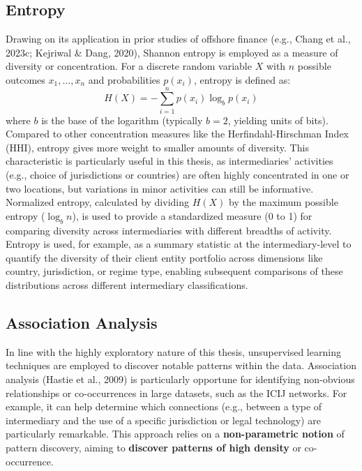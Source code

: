 \subsection{Entropy}
\label{subsec:entropy}
Drawing on its application in prior studies of offshore finance (e.g., Chang et al., 2023c; Kejriwal \& Dang, 2020), Shannon entropy is employed as a measure of diversity or concentration. For a discrete random variable $X$ with $n$ possible outcomes $x_1, ..., x_n$ and probabilities $p(x_i)$, entropy is defined as:
\begin{equation}
    H(X) = -\sum_{i=1}^{n} p(x_i) \log_b p(x_i)
\end{equation}
where $b$ is the base of the logarithm (typically $b=2$, yielding units of bits). Compared to other concentration measures like the Herfindahl-Hirschman Index (HHI), entropy gives more weight to smaller amounts of diversity. This characteristic is particularly useful in this thesis, as intermediaries' activities (e.g., choice of jurisdictions or countries) are often highly concentrated in one or two locations, but variations in minor activities can still be informative. Normalized entropy, calculated by dividing $H(X)$ by the maximum possible entropy ($\log_b n$), is used to provide a standardized measure (0 to 1) for comparing diversity across intermediaries with different breadths of activity. Entropy is used, for example, as a summary statistic at the intermediary-level to quantify the diversity of their client entity portfolio across dimensions like country, jurisdiction, or regime type, enabling subsequent comparisons of these distributions across different intermediary classifications.

\subsection{Association Analysis}
\label{subsec:unsupervised_learning}
In line with the highly exploratory nature of this thesis, unsupervised learning techniques are employed to discover notable patterns within the data. Association analysis (Hastie et al., 2009) is particularly opportune for identifying non-obvious relationships or co-occurrences in large datasets, such as the ICIJ networks. For example, it can help determine which connections (e.g., between a type of intermediary and the use of a specific jurisdiction or legal technology) are particularly remarkable. This approach relies on a \textbf{non-parametric notion} of pattern discovery, aiming to \textbf{discover patterns of high density} or co-occurrence.

